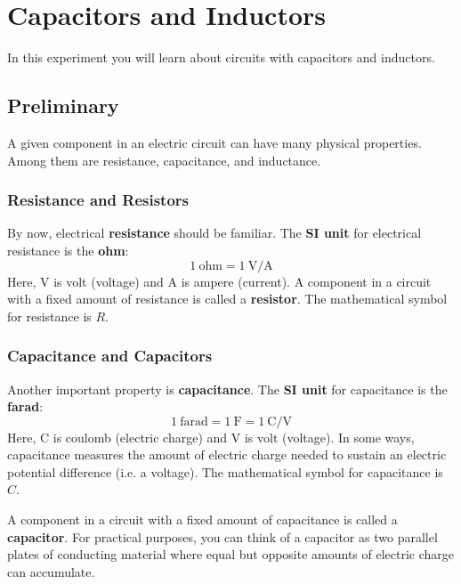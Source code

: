 \setcounter{chapter}{4}
\chapter{Capacitors and Inductors}
%
In this experiment you will learn about circuits with capacitors and inductors.
%
\section{Preliminary}
%
A given component in an electric circuit can have many physical properties. Among them are resistance, capacitance, and inductance.
%
\subsection{Resistance and Resistors}
%
By now, electrical \textbf{resistance} should be familiar. The \textbf{SI unit} for electrical resistance is the \textbf{ohm}:
\begin{equation}
	1 \ \text{ohm} = 1 \ \text{V/A}
\end{equation}
Here, V is volt (voltage) and A is ampere (current). A component in a circuit with a fixed amount of resistance is called a \textbf{resistor}. The mathematical symbol for resistance is $R$.
%
\subsection{Capacitance and Capacitors}
%
Another important property is \textbf{capacitance}. The \textbf{SI unit} for capacitance is the \textbf{farad}:
\begin{equation}
	1 \ \text{farad} = 1 \ \text{F} = 1 \ \text{C/V}
\end{equation}
Here, C is coulomb (electric charge) and V is volt (voltage). In some ways, capacitance measures the amount of electric charge needed to sustain an electric potential difference (i.e. a voltage). The mathematical symbol for capacitance is $C$.

A component in a circuit with a fixed amount of capacitance is called a \textbf{capacitor}. For practical purposes, you can think of a capacitor as two parallel plates of conducting material where equal but opposite amounts of electric charge can accumulate.
%
